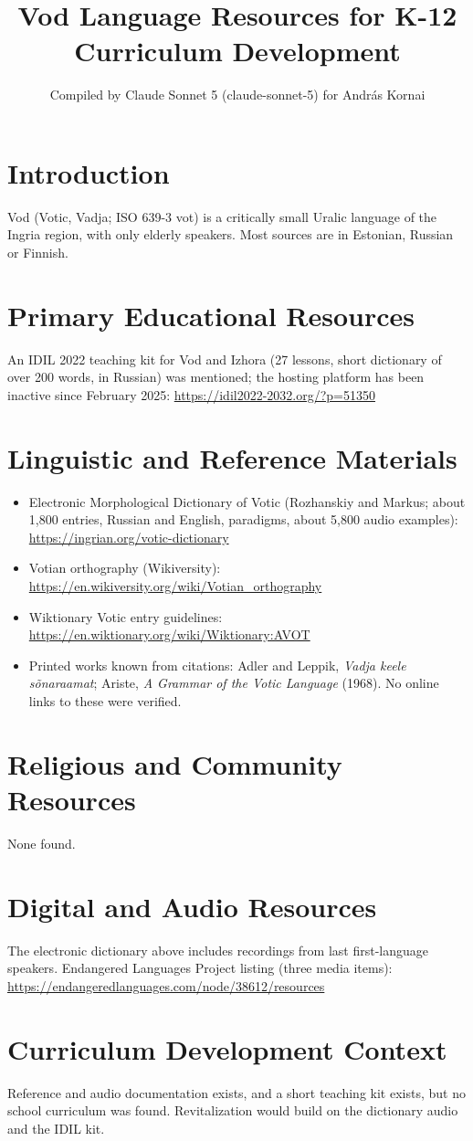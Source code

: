 \documentclass[12pt]{article}
\title{Vod Language Resources for K-12 Curriculum Development}
\author{Compiled by Claude Sonnet 5 (claude-sonnet-5) for Andr\'as Kornai}
\date{}
\begin{document}
\maketitle

\section{Introduction}
Vod (Votic, Vadja; ISO 639-3 vot) is a critically small Uralic language of the Ingria region, with only elderly speakers. Most sources are in Estonian, Russian or Finnish.

\section{Primary Educational Resources}
An IDIL 2022 teaching kit for Vod and Izhora (27 lessons, short dictionary of over 200 words, in Russian) was mentioned; the hosting platform has been inactive since February 2025: \url{https://idil2022-2032.org/?p=51350}

\section{Linguistic and Reference Materials}
\begin{itemize}
\item Electronic Morphological Dictionary of Votic (Rozhanskiy and Markus; about 1,800 entries, Russian and English, paradigms, about 5,800 audio examples): \url{https://ingrian.org/votic-dictionary}
\item Votian orthography (Wikiversity): \url{https://en.wikiversity.org/wiki/Votian_orthography}
\item Wiktionary Votic entry guidelines: \url{https://en.wiktionary.org/wiki/Wiktionary:AVOT}
\item Printed works known from citations: Adler and Leppik, \emph{Vadja keele s\~onaraamat}; Ariste, \emph{A Grammar of the Votic Language} (1968). No online links to these were verified.
\end{itemize}

\section{Religious and Community Resources}
None found.

\section{Digital and Audio Resources}
The electronic dictionary above includes recordings from last first-language speakers. Endangered Languages Project listing (three media items): \url{https://endangeredlanguages.com/node/38612/resources}

\section{Curriculum Development Context}
Reference and audio documentation exists, and a short teaching kit exists, but no school curriculum was found. Revitalization would build on the dictionary audio and the IDIL kit.
\end{document}
